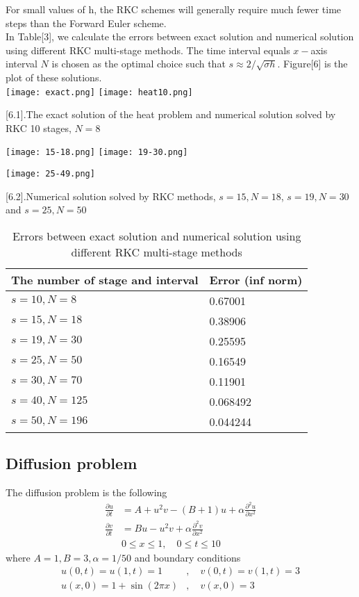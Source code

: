 \documentclass{article}
\theoremstyle{theorem}
\theoremstyle{definition}
\begin{document}
	For small values of h, the RKC schemes will generally require much fewer time steps than the Forward Euler scheme.\\
	In Table[3], we calculate the errors between exact solution and numerical solution using different RKC multi-stage methods. The time interval equals $x-$axis interval $N$ is chosen as the optimal choice such that $s \approx 2/\sqrt{\sigma h}$. Figure[6] is the plot of these solutions.\\
			\texttt{[image: exact.png]}
		\texttt{[image: heat10.png]} \begin{center}
		\figurename[6.1]{.The exact solution of the heat problem and numerical solution solved by RKC 10 stages, $N=8$} 
	\end{center}		
			\texttt{[image: 15-18.png]}
		\texttt{[image: 19-30.png]}
	\begin{center}
			\texttt{[image: 25-49.png]}
	\end{center}
		\begin{center}\figurename[6.2]{.Numerical solution solved by RKC methods, $s=15,N=18$,  $s=19,N=30$ and  $s=25,N=50$}
		\end{center}
	
		\begin{table}
		\begin{tabular}{ | m{15em} | m{2.5cm}|  }  
			\hline
			The number of stage and interval & Error (inf norm)\\
			\hline
			$s=10 , N=8$ &  0.67001\\
			\hline 
			$s=15 , N=18$ & 0.38906 \\
		\hline
			$s=19 , N=30$ & 0.25595 \\
		\hline
			$s=25 , N=50$ & 0.16549 \\
		\hline
			$s=30 , N=70$ & 0.11901 \\
		\hline
			$s=40 , N=125$ & 0.068492 \\
		\hline
			$s=50 , N=196$ & 0.044244 \\
		\hline
		\end{tabular}
	\caption{Errors between exact solution and numerical solution using different RKC multi-stage methods }
	\end{table}
\subsection{Diffusion problem}	The diffusion problem is the following
$$\begin{aligned}\frac{\partial u}{\partial t}&=A+u^2v-(B+1)u+\alpha \frac{\partial^2u}{\partial x^2} \\ \frac{\partial v}{\partial t}&=Bu-u^2v+\alpha \frac{\partial^2v}{\partial x^2} \\
& 0 \le x \le 1, \quad 0 \le t \le 10 \end{aligned}$$
where $A=1,B=3, \alpha = 1/50$ and boundary conditions $$\begin{aligned} u(0,t)=u(1,t)=1&, \quad v(0,t)=v(1,t)=3 \\
u(x,0)=1+\sin(2\pi x)&, \quad v(x,0)=3 \end{aligned}$$
\end{document}
